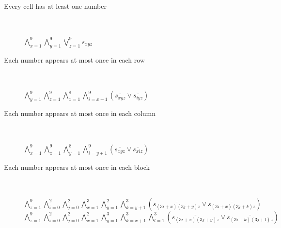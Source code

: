 \documentclass[12pt]{article}
\newcounter{row}
\newcounter{col}
\begin{document}
\begin{description}
\item[Every cell has at least one number] \hfill \\ \\
$\bigwedge\limits_{x=1}^{9} \bigwedge\limits_{y=1}^{9} \bigvee\limits_{z=1}^{9} s_{xyz}$
\item[Each number appears at most once in each row] \hfill \\ \\
$\bigwedge\limits_{y=1}^{9} \bigwedge\limits_{z=1}^{9} \bigwedge\limits_{x=1}^{8} \bigwedge\limits_{i=x+1}^{9}  (\overline{s_{xyz}} \vee \overline{s_{iyz}})$
\item[Each number appears at most once in each column] \hfill \\ \\
$\bigwedge\limits_{x=1}^{9} \bigwedge\limits_{z=1}^{9} \bigwedge\limits_{y=1}^{8} \bigwedge\limits_{i=y+1}^{9}  (\overline{s_{xyz}} \vee \overline{s_{xiz}})$
\item[Each number appears at most once in each block] \hfill \\ \\
$\bigwedge\limits_{z=1}^{9} \bigwedge\limits_{i=0}^{2} \bigwedge\limits_{j=0}^{2} \bigwedge\limits_{x=1}^{3} \bigwedge\limits_{y=1}^{2} \bigwedge\limits_{k=y+1}^{3} (\overline{s_{(3i+x)(3j+y)z}} \vee \overline{s_{(3i+x)(3j+k)z}})$ \\

$\bigwedge\limits_{z=1}^{9} \bigwedge\limits_{i=0}^{2} \bigwedge\limits_{j=0}^{2} \bigwedge\limits_{x=1}^{2} \bigwedge\limits_{y=1}^{3} \bigwedge\limits_{k=x+1}^{3} \bigwedge\limits_{l=1}^{3} (\overline{s_{(3i+x)(3j+y)z}} \vee \overline{s_{(3i+k)(3j+l)z}})$
\end{description}
\end{document}
